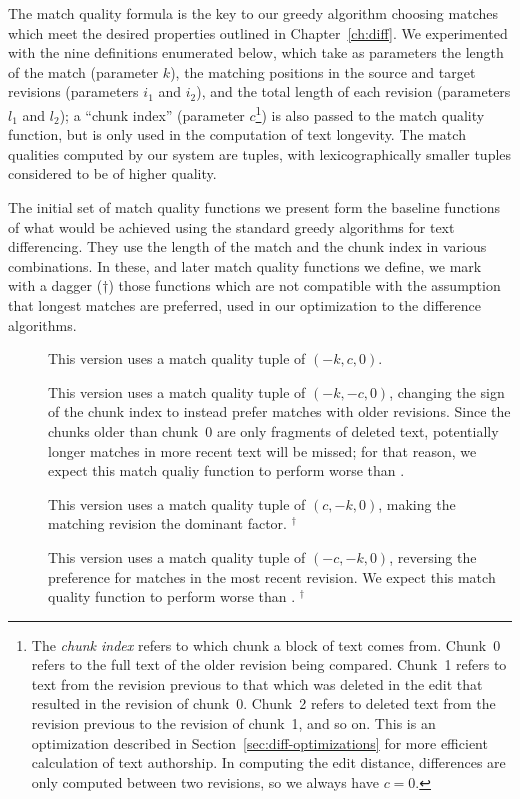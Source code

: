 The match quality formula is the key to our greedy algorithm
choosing matches which meet the desired properties outlined
in Chapter~\ref{ch:diff}.
We experimented with the nine definitions enumerated below,
which take as parameters the length of the match (parameter $k$),
the matching positions in the source and target revisions
(parameters $i_1$ and $i_2$), and the total length of
each revision (parameters $l_1$ and $l_2$);
a ``chunk index'' (parameter $c$\footnote{The \textit{chunk index} refers
to which chunk a block of text comes from.
Chunk~0 refers to the full text of the older revision being compared.
Chunk~1 refers to text from the revision previous to that which was
deleted in the edit that resulted in the revision of chunk~0.
Chunk~2 refers to deleted text from the revision previous to the
revision of chunk~1, and so on.
This is an optimization described in Section~\ref{sec:diff-optimizations}
for more efficient calculation of text authorship.
In computing the edit distance, differences are only computed
between two revisions, so we always have $c=0$.
}) is also passed to the match quality function,
but is only used in the computation of text longevity.
The match qualities computed by our system are tuples,
with lexicographically smaller tuples considered to be
of higher quality.


The initial set of match quality functions we present form the baseline
functions of what would be achieved using the standard greedy
algorithms for text differencing.
They use the length of the match and the chunk index in various
combinations.
In these, and later match quality functions we define,
we mark with a dagger ($\dagger$) those functions which are
not compatible with the assumption that longest matches are
preferred, used in our  optimization
to the difference algorithms.
%
\begin{description}
\item[]
    This version uses a match quality tuple of $(-k, c, 0)$.

\item[]
    This version uses a match quality tuple of $(-k, -c, 0)$,
    changing the sign of the chunk index to instead prefer
    matches with older revisions.
    Since the chunks older than chunk~0 are only fragments of
    deleted text, potentially longer matches in more recent
    text will be missed; for that reason, we expect this
    match qualiy function to perform worse than .

\item[]
    This version uses a match quality tuple of $(c, -k, 0)$,
    making the matching revision the dominant factor.
    ${}^\dagger$

\item[]
    This version uses a match quality tuple of $(-c, -k, 0)$,
    reversing the preference for matches in the most recent revision.
    We expect this match quality function to perform
    worse than .
    ${}^\dagger$

\end{description}

